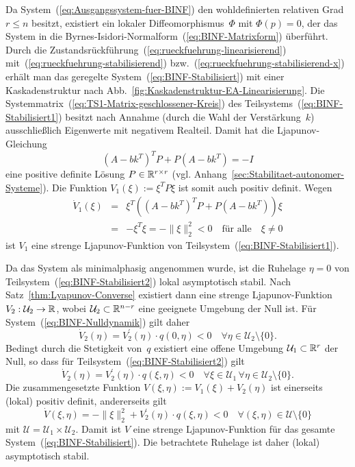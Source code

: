 \begin{svmultproof2}
Da System~(\ref{eq:Ausgangssystem-fuer-BINF}) den wohldefinierten
relativen Grad $r\leq n$ besitzt, existiert ein lokaler Diffeomorphismus~$\Phi$
mit $\Phi(p)=0$, der das System in die Byrnes-Isidori-Normalform~(\ref{eq:BINF-Matrixform})
überführt. Durch die Zustandsrückführung~(\ref{eq:rueckfuehrung-linearisierend})
mit~(\ref{eq:rueckfuehrung-stabilisierend}) bzw.~(\ref{eq:rueckfuehrung-stabilisierend-x})
erhält man das geregelte System~(\ref{eq:BINF-Stabilisiert}) mit
einer Kaskadenstruktur nach Abb.~\ref{fig:Kaskadenstruktur-EA-Linearisierung}.
Die Systemmatrix~(\ref{eq:TS1-Matrix-geschlossener-Kreis}) des Teil\-systems~(\ref{eq:BINF-Stabilisiert1})
besitzt nach Annahme (durch die Wahl der Verstärkung~$k$) ausschließlich
Eigenwerte mit negativem Realteil. Damit hat die Ljapunov-Gleichung
\begin{equation}
(A-bk^{T})^{T}P+P(A-bk^{T})=-I\label{eq:TS1-Lyap-Gleichung}
\end{equation}
eine positive definite Lösung $P\in{\mathbb{R}}^{r\times r}$ (vgl. Anhang~\ref{sec:Stabilitaet-autonomer-Systeme}).
Die Funktion $V_{1}(\xi):=\xi^{T}P\xi$ ist somit auch positiv definit.
Wegen 
\begin{eqnarray*}
\dot{V}_{1}(\xi) & = & \xi^{T}\left((A-bk^{T})^{T}P+P(A-bk^{T})\right)\xi\\
 & = & -\xi^{T}\xi=-\|\xi\|_{2}^{2}<0\quad\text{für alle}\quad\xi\neq0
\end{eqnarray*}
ist $V_{1}$ eine strenge Ljapunov-Funktion
von Teilsystem~(\ref{eq:BINF-Stabilisiert1}).

Da das System als minimalphasig angenommen wurde, ist die Ruhelage
$\eta=0$ von Teilsystem~(\ref{eq:BINF-Stabilisiert2}) lokal asymptotisch
stabil. Nach Satz~\ref{thm:Lyapunov-Converse} existiert dann eine
strenge Ljapunov-Funktion $V_{2}:\mathcal{U}_{2}\to{\mathbb{R}}$, wobei $\mathcal{U}_{2}\subset{\mathbb{R}}^{n-r}$
eine geeignete Umgebung der Null ist. Für System~(\ref{eq:BINF-Nulldynamik})
gilt daher 
\[
\dot{V}_{2}(\eta)=V_{2}^{\prime}(\eta)\cdot q(0,\eta)<0\quad\forall\eta\in\mathcal{U}_{2}\setminus\{0\}.
\]
Bedingt durch die Stetigkeit von~$q$ existiert eine offene Umgebung
$\mathcal{U}_{1}\subset{\mathbb{R}}^{r}$ der Null, so dass für Teilsystem~(\ref{eq:BINF-Stabilisiert2})
gilt
\[
\dot{V}_{2}(\eta)=V_{2}^{\prime}(\eta)\cdot q(\xi,\eta)<0\quad\forall\xi\in\mathcal{U}_{1}\,\forall\eta\in\mathcal{U}_{2}\setminus\{0\}.
\]
Die zusammengesetzte Funktion $V(\xi,\eta):=V_{1}(\xi)+V_{2}(\eta)$
ist einerseits (lokal) positiv definit, andererseits gilt 
\[
\dot{V}(\xi,\eta)=-\|\xi\|_{2}^{2}+V_{2}^{\prime}(\eta)\cdot q(\xi,\eta)<0\quad\forall(\xi,\eta)\in\mathcal{U}\setminus\{0\}
\]
mit $\mathcal{U}=\mathcal{U}_{1}\times\mathcal{U}_{2}$. Damit ist
$V$ eine strenge Ljapunov-Funktion für
das gesamte System~(\ref{eq:BINF-Stabilisiert}). Die betrachtete
Ruhelage ist daher (lokal) asymptotisch stabil.
\end{svmultproof2}

